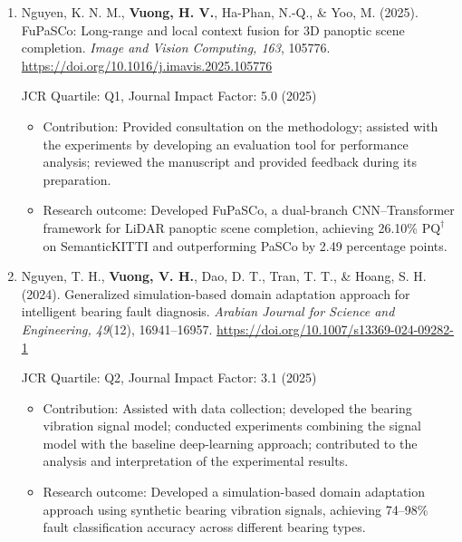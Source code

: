 \documentclass[a4paper,12pt]{article}
\begin{document}
\begin{enumerate}[
    leftmargin=*,
    labelsep=0.5em,
    align=left
]
  \item
  Nguyen, K. N. M., \textbf{Vuong, H. V.}, Ha-Phan, N.-Q., \& Yoo, M. (2025).
  FuPaSCo: Long-range and local context fusion for 3D panoptic scene completion.
  \textit{Image and Vision Computing, 163}, 105776.
  \href{https://doi.org/10.1016/j.imavis.2025.105776}
  {https://doi.org/10.1016/j.imavis.2025.105776}

  JCR Quartile: Q1, Journal Impact Factor: 5.0 (2025)

\begin{itemize}[leftmargin=1.5em]

    \item Contribution: Provided consultation on the methodology; assisted with the experiments by developing an evaluation tool for performance analysis; reviewed the manuscript and provided feedback during its preparation.
    \item Research outcome: Developed FuPaSCo, a dual-branch
    CNN--Transformer framework for LiDAR panoptic scene completion,
    achieving 26.10\% $\mathrm{PQ}^\dagger$ on SemanticKITTI and
    outperforming PaSCo by 2.49 percentage points.

\end{itemize}

  \item
  Nguyen, T. H., \textbf{Vuong, V. H.}, Dao, D. T., Tran, T. T., \& Hoang, S. H. (2024).
  Generalized simulation-based domain adaptation approach for intelligent bearing fault diagnosis.
  \textit{Arabian Journal for Science and Engineering, 49}(12), 16941--16957.
  \href{https://doi.org/10.1007/s13369-024-09282-1}
  {https://doi.org/10.1007/s13369-024-09282-1}

  JCR Quartile: Q2, Journal Impact Factor: 3.1 (2025)

\begin{itemize}[leftmargin=1.5em]

    \item Contribution: Assisted with data collection; developed the
    bearing vibration signal model; conducted experiments combining the signal model with the baseline deep-learning approach; contributed to the analysis and interpretation of the experimental results.
    \item Research outcome: Developed a simulation-based domain adaptation
    approach using synthetic bearing vibration signals, achieving
    74--98\% fault classification accuracy across different bearing types.

\end{itemize}

\end{enumerate}
\end{document}
